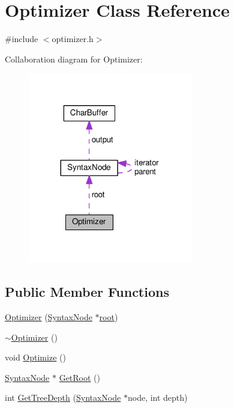 \hypertarget{classOptimizer}{}\section{Optimizer Class Reference}
\label{classOptimizer}


{\ttfamily \#include $<$optimizer.\+h$>$}



Collaboration diagram for Optimizer\+:
\nopagebreak
\begin{figure}[H]
\begin{center}
\leavevmode
\includegraphics[width=203pt]{db/db8/classOptimizer__coll__graph}
\end{center}
\end{figure}
\subsection*{Public Member Functions}
\begin{DoxyCompactItemize}
\item 
\hyperlink{classOptimizer_a7b4482e542418f5b32a1c9960428c54a}{Optimizer} (\hyperlink{classSyntaxNode}{Syntax\+Node} $\ast$\hyperlink{classOptimizer_a665ceeca2e548de6fc68827fb910bd98}{root})
\item 
\hyperlink{classOptimizer_ab01202385afea2f09afbd73227736a17}{$\sim$\+Optimizer} ()
\item 
void \hyperlink{classOptimizer_a5764ae0825fa43921f74d8b972e53b1e}{Optimize} ()
\item 
\hyperlink{classSyntaxNode}{Syntax\+Node} $\ast$ \hyperlink{classOptimizer_ae50ae3a88ea8f5161b9bb072ccf4ea93}{Get\+Root} ()
\item 
int \hyperlink{classOptimizer_a4a80c3e845604f1ea53a6bfc187b2bba}{Get\+Tree\+Depth} (\hyperlink{classSyntaxNode}{Syntax\+Node} $\ast$node, int depth)
\end{DoxyCompactItemize}
